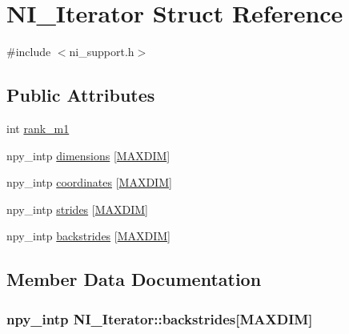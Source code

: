 \hypertarget{structNI__Iterator}{}\section{N\+I\+\_\+\+Iterator Struct Reference}
\label{structNI__Iterator}


{\ttfamily \#include $<$ni\+\_\+support.\+h$>$}

\subsection*{Public Attributes}
\begin{DoxyCompactItemize}
\item 
int \hyperlink{structNI__Iterator_aad24039ebd2a945a1998806b7cfb8414}{rank\+\_\+m1}
\item 
npy\+\_\+intp \hyperlink{structNI__Iterator_a8ae5515b3c5daafcce2eca2b6074b987}{dimensions} \mbox{[}\hyperlink{nd__image_8h_a674c1a85fb1c09ec56b0b8f6319e7b97}{M\+A\+X\+D\+I\+M}\mbox{]}
\item 
npy\+\_\+intp \hyperlink{structNI__Iterator_a49cabc4ddd05ec40e2f41c820536c3df}{coordinates} \mbox{[}\hyperlink{nd__image_8h_a674c1a85fb1c09ec56b0b8f6319e7b97}{M\+A\+X\+D\+I\+M}\mbox{]}
\item 
npy\+\_\+intp \hyperlink{structNI__Iterator_acf7314541d32adec17c07a026171c09d}{strides} \mbox{[}\hyperlink{nd__image_8h_a674c1a85fb1c09ec56b0b8f6319e7b97}{M\+A\+X\+D\+I\+M}\mbox{]}
\item 
npy\+\_\+intp \hyperlink{structNI__Iterator_a8cc074cb963c0af37004e0c634eabfb5}{backstrides} \mbox{[}\hyperlink{nd__image_8h_a674c1a85fb1c09ec56b0b8f6319e7b97}{M\+A\+X\+D\+I\+M}\mbox{]}
\end{DoxyCompactItemize}


\subsection{Member Data Documentation}
\hypertarget{structNI__Iterator_a8cc074cb963c0af37004e0c634eabfb5}{}
\subsubsection[{backstrides}]{\setlength{\rightskip}{0pt plus 5cm}npy\+\_\+intp N\+I\+\_\+\+Iterator\+::backstrides\mbox{[}{\bf M\+A\+X\+D\+I\+M}\mbox{]}}\label{structNI__Iterator_a8cc074cb963c0af37004e0c634eabfb5}
\hypertarget{structNI__Iterator_a49cabc4ddd05ec40e2f41c820536c3df}{}

